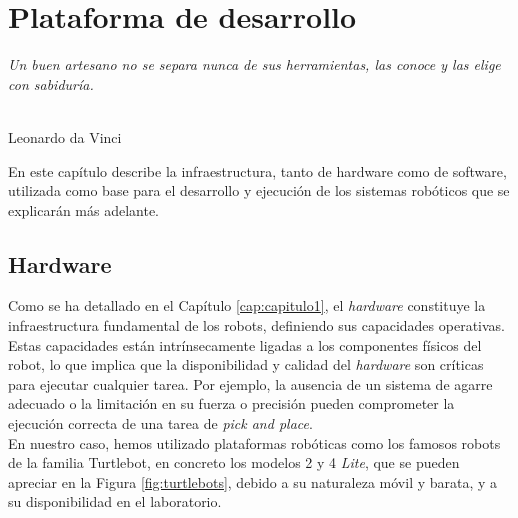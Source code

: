\chapter{Plataforma de desarrollo}
\label{cap:capitulo3}

\begin{flushright}
\begin{minipage}[]{10cm}
\emph{Un buen artesano no se separa nunca de sus herramientas, las conoce y las elige con sabiduría.}\\
\end{minipage}\\

Leonardo da Vinci\\
\end{flushright}

\vspace{1cm}


En este capítulo describe la infraestructura, tanto de hardware como de
software, utilizada como base para el desarrollo y ejecución de los sistemas
robóticos que se explicarán más adelante.

\section{Hardware}
\label{sec:hardware}

Como se ha detallado en el Capítulo \ref{cap:capitulo1}, el \textit{hardware}
constituye la infraestructura fundamental de los robots, definiendo sus
capacidades operativas.
Estas capacidades están intrínsecamente ligadas a los componentes físicos del
robot, lo que implica que la disponibilidad y calidad del \textit{hardware} son
críticas para ejecutar cualquier tarea.
Por ejemplo, la ausencia de un sistema de agarre adecuado o la limitación en su
fuerza o precisión pueden comprometer la ejecución correcta de una tarea de
\textit{pick and place}.
\\

En nuestro caso, hemos utilizado plataformas robóticas como los famosos robots
de la familia Turtlebot, en concreto los modelos 2 y 4 \textit{Lite}, que se
pueden apreciar en la Figura \ref{fig:turtlebots}, debido a su naturaleza móvil
y barata, y a su disponibilidad en el laboratorio.
\\

